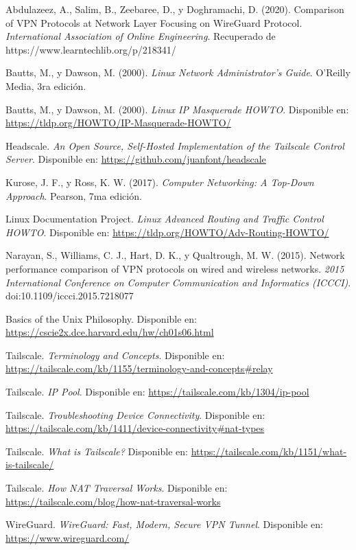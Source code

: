 
%


\begin{thebibliography}{99}

Abdulazeez, A., Salim, B., Zeebaree, D., y Doghramachi, D. (2020). Comparison of VPN Protocols at Network Layer Focusing on WireGuard Protocol. \textit{International Association of Online Engineering}. Recuperado de https://www.learntechlib.org/p/218341/

Bautts, M., y Dawson, M. (2000). \textit{Linux Network Administrator’s Guide}. O’Reilly Media, 3ra edición.

Bautts, M., y Dawson, M. (2000). \textit{Linux IP Masquerade HOWTO}. Disponible en: \url{https://tldp.org/HOWTO/IP-Masquerade-HOWTO/}

Headscale. \textit{An Open Source, Self-Hosted Implementation of the Tailscale Control Server}. Disponible en: \url{https://github.com/juanfont/headscale}

Kurose, J. F., y Ross, K. W. (2017). \textit{Computer Networking: A Top-Down Approach}. Pearson, 7ma edición.

Linux Documentation Project. \textit{Linux Advanced Routing and Traffic Control HOWTO}. Disponible en: \url{https://tldp.org/HOWTO/Adv-Routing-HOWTO/}

Narayan, S., Williams, C. J., Hart, D. K., y Qualtrough, M. W. (2015). Network performance comparison of VPN protocols on wired and wireless networks. \textit{2015 International Conference on Computer Communication and Informatics (ICCCI)}. doi:10.1109/iccci.2015.7218077

Basics of the Unix Philosophy. Disponible en: \url{https://cscie2x.dce.harvard.edu/hw/ch01s06.html}

Tailscale. \textit{Terminology and Concepts}. Disponible en: \url{https://tailscale.com/kb/1155/terminology-and-concepts#relay}

Tailscale. \textit{IP Pool}. Disponible en: \url{https://tailscale.com/kb/1304/ip-pool}

Tailscale. \textit{Troubleshooting Device Connectivity}. Disponible en: \url{https://tailscale.com/kb/1411/device-connectivity#nat-types}

Tailscale. \textit{What is Tailscale?} Disponible en: \url{https://tailscale.com/kb/1151/what-is-tailscale/}

Tailscale. \textit{How NAT Traversal Works}. Disponible en: \url{https://tailscale.com/blog/how-nat-traversal-works}

WireGuard. \textit{WireGuard: Fast, Modern, Secure VPN Tunnel}. Disponible en: \url{https://www.wireguard.com/}

\end{thebibliography}

